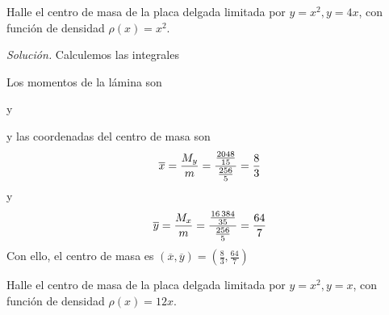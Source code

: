 \begin{ejemplo}
\textnormal{Halle el centro de masa de la placa delgada limitada por \textit{$y=x^{2},y=4x$}, con función de densidad \textit{$\rho \left( x\right) =x^{2}.$}}
\end{ejemplo}

\textit{Solución.} Calculemos las integrales



Los momentos de la lámina son


y



y las coordenadas del centro de masa son
\[
\overline{x}=\frac{M_{y}}{m}=\frac{\frac{2048}{15}}{\frac{256}{5}}=\frac{8}{%
	3}
\]
y
\[
\overline{y}=\frac{M_{x}}{m}=\frac{\frac{16\,384}{35}}{\frac{256}{5}}=\frac{%
	64}{7}
\]
Con ello, el centro de masa es $\left( \overline{x},\overline{y}\right) =\left( \frac{8}{3},%
\frac{64}{7}\right) $

\begin{ejemplo}
\textnormal{Halle el centro de masa de la placa delgada limitada por \textit{$%
y=x^{2},y=x$}, con función de densidad \textit{$\rho \left( x\right) =12x.$}}
\end{ejemplo}

